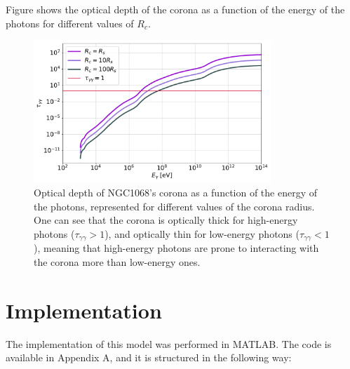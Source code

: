 Figure  shows the optical depth of the corona as a function of the energy of the photons for different values of $R_c$.

\begin{figure}[ht]
    \includegraphics[width=0.8\textwidth]{Figures/OpticalDepths.pdf}
    \centering
    \caption{Optical depth of NGC1068's corona as a function of the energy of the photons, represented for different values of the corona radius. One can see that the corona is optically thick for high-energy photons ($\tau_{\gamma\gamma}>1$), and optically thin for low-energy photons ($\tau_{\gamma\gamma}<1$), meaning that high-energy photons are prone to interacting with the corona more than low-energy ones.}
    \label{fig:optical_depth_as_function_of_corona_radius}
\end{figure}


\section{Implementation}

The implementation of this model was performed in MATLAB. The code is available in Appendix A, and it is structured in the following way:


